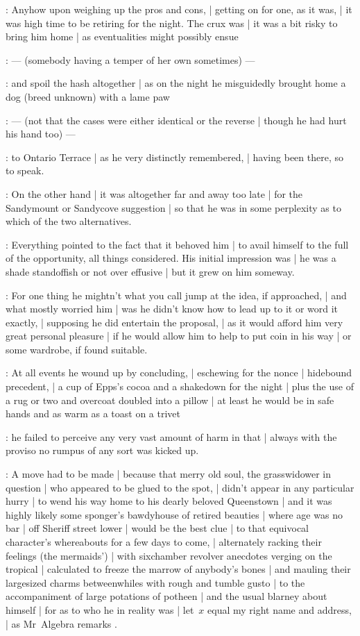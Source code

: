 :
Anyhow upon weighing up the pros and cons, |
getting on for one, as it was, |
it was high time to be retiring for the night.
The crux was |
it was a bit risky to bring him home |
as eventualities might possibly ensue

:
    --- (somebody having a temper of her own sometimes) ---

:
and spoil the hash altogether |
as on the night he misguidedly brought home a dog (breed unknown) with a lame paw

:
    --- (not that the cases were either identical or the reverse |
        though he had hurt his hand too) ---

:
to Ontario Terrace |
as he very distinctly remembered, |
having been there, so to speak.

:
On the other hand |
it was altogether far and away too late |
for the Sandymount or Sandycove suggestion |
so that he was in some perplexity as to which of the two alternatives.

:
Everything pointed to the fact that it behoved him |
to avail himself to the full of the opportunity, all things considered.
His initial impression was |
he was a shade standoffish or not over effusive |
but it grew on him someway.

:
For one thing he mightn't what you call jump at the idea, if approached, |
and what mostly worried him |
was he didn't know how to lead up to it or word it exactly, |
supposing he did entertain the proposal, |
as it would afford him very great personal pleasure |
if he would allow him to help to put coin in his way |
or some wardrobe, if found suitable.

:
At all events he wound up by concluding, |
eschewing for the nonce |
hidebound precedent, |
a cup of Epps's cocoa and a shakedown for the night |
plus the use of a rug or two and overcoat doubled into a pillow |
at least he would be in safe hands and as warm as a toast on a trivet

:
he failed to perceive any very vast amount of harm in that |
always with the proviso no rumpus of any sort was kicked up.

:
A move had to be made |
because that merry old soul, the grasswidower in question |
who appeared to be glued to the spot, |
didn't appear in any particular hurry |
to wend his way home to his dearly beloved Queenstown |
and it was highly likely some sponger's bawdyhouse of retired beauties |
where age was no bar |
off Sheriff street lower |
would be the best clue |
to that equivocal character's whereabouts for a few days to come, |
alternately racking their feelings (the mermaids') |
with sixchamber revolver anecdotes verging on the tropical |
calculated to freeze the marrow of anybody's bones |
and mauling their largesized charms betweenwhiles with rough and tumble gusto |
to the accompaniment of large potations of potheen |
and the usual blarney about himself |
for as to who he in reality was |
let~$x$ equal my right name and address, |
as Mr~Algebra remarks .

